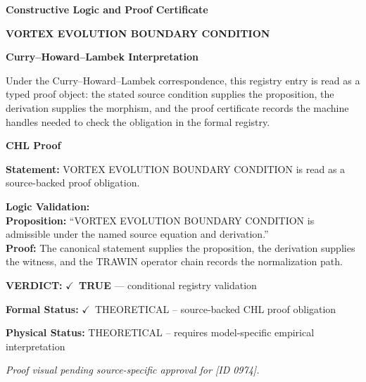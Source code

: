 \clearpage
\begingroup\tzpsupportsetup
\noindent\textbf{\fontsize{10.8pt}{12.8pt}\selectfont [ID 0974] Constructive Logic and Proof Certificate}\par
\noindent\textbf{\fontsize{10pt}{12pt}\selectfont VORTEX EVOLUTION BOUNDARY CONDITION}\par
\vspace{0.45em}
\begingroup
\footnotesize
\setlength{\parskip}{0.22em}
\setlength{\parindent}{0pt}
\noindent\textbf{Curry--Howard--Lambek Interpretation}\par
Under the Curry--Howard--Lambek correspondence, this registry entry is read as a typed proof
object: the stated source condition supplies the proposition, the derivation supplies the
morphism, and the proof certificate records the machine handles needed to check the obligation
in the formal registry.

\vspace{0.45em}
\noindent\textbf{CHL Proof}\par
\textbf{Statement:} VORTEX EVOLUTION BOUNDARY CONDITION is read as a source-backed proof obligation.

\textbf{Logic Validation:}\\
\textbf{Proposition:} ``VORTEX EVOLUTION BOUNDARY CONDITION is admissible under the named source equation and derivation.''\\
\textbf{Proof:} The canonical statement supplies the proposition, the derivation supplies the witness, and the TRAWIN operator chain records the normalization path.

\textbf{VERDICT:} \ensuremath{\checkmark}\ \textbf{TRUE} --- conditional registry validation

\textbf{Formal Status:} \ensuremath{\checkmark}\ THEORETICAL -- source-backed CHL proof obligation

\textbf{Physical Status:} THEORETICAL -- requires model-specific empirical interpretation
\par\vspace{0.45em}
\par
\vfill
\begingroup\footnotesize\itshape
Proof visual pending source-specific approval for [ID 0974].
\par\endgroup
\vfill
\endgroup
\endgroup
